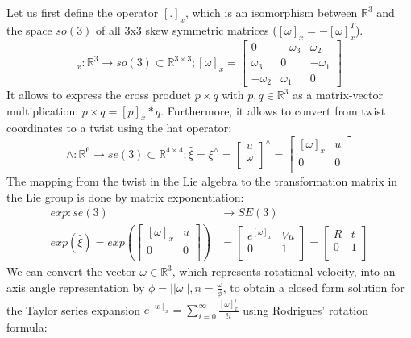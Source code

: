 \documentclass[12pt, a4paper]{article}
\begin{document}
Let us first define the operator $[.]_x$, which is an isomorphism between $\mathbb{R}^3$ and the space $so(3)$ of all 3x3 skew symmetric matrices ($[\omega]_x = -[\omega]_x^T$).
\begin{equation}
[.]_x : \mathbb{R}^3 \rightarrow so(3) \subset \mathbb{R}^{3 \times 3} ; 
[\omega]_x = 
\begin{bmatrix}
 0 & -\omega_3 & \omega_2\\
 \omega_3 & 0  & -\omega_1\\
 -\omega_2 & \omega_1 & 0
\end{bmatrix}
\label{eq:crossmatrix}
\end{equation}
It allows to express the cross product $p \times q$ with $p,q \in \mathbb{R}^3$ as a matrix-vector multiplication: $ p \times q = [p]_x * q$. Furthermore, it allows to convert from twist coordinates to a twist using the hat operator:
\[
\wedge : \mathbb{R}^6 \rightarrow se(3) \subset \mathbb{R}^{4 \times 4} ; 
\hat\xi = 
\xi^\wedge = 
\begin{bmatrix}
 u \\
 \omega \\
\end{bmatrix}^\wedge
=
\begin{bmatrix}
 [\omega]_x & u\\
 0 & 0\\
\end{bmatrix}
\]
The mapping from the twist in the Lie algebra to the transformation matrix in the Lie group is done by matrix exponentiation:
\begin{equation}
\label{eq:lieexp}
\begin{aligned}
exp : se(3) &\rightarrow SE(3) \\
exp(\hat\xi) = %
exp\left(
\begin{bmatrix}
 [\omega]_x & u\\
 0 & 0\\
\end{bmatrix}
\right)
&=
\begin{bmatrix}
 e^{[\omega]_x} & Vu\\
 0 & 1\\
\end{bmatrix}
=
\begin{bmatrix}
 R & t\\
 0 & 1\\
\end{bmatrix}
\end{aligned}
\end{equation}
We can convert the vector $\omega \in \mathbb{R}^3$, which represents rotational velocity, into an axis angle representation by $ \phi = ||\omega||,  n=\frac{\omega}{\phi}$, to obtain a closed form solution for the Taylor series expansion $e^{[w]_x} = \sum_{i=0}^\infty \frac{[\omega]_x^i}{!i}$ using Rodrigues' rotation formula:
\end{document}
